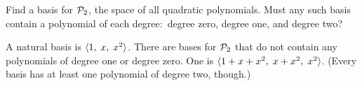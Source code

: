 
\begin{Exercise}[
name={},
title={}, 
difficulty=0,
origin={\cite{JH}}]
    Find a basis for \(  \mathcal{P}_2 \), the space of all quadratic
    polynomials.
    Must any such basis contain a polynomial of each degree:~degree zero, 
    degree one, and degree two?
\end{Exercise}

\begin{Answer}
A natural basis is \( \langle1,\;x,\;x^2\rangle \).
There are bases for $\mathcal{P}_2$ that do not contain any polynomials 
of degree one or degree zero.
One is \( \langle1+x+x^2,\;x+x^2,\;x^2\rangle \).
(Every basis has at least one polynomial of degree two, though.)

\end{Answer}
